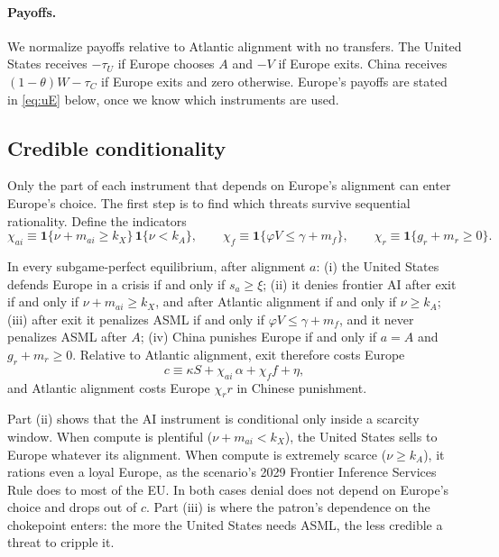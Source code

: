 

\paragraph{Payoffs.} We normalize payoffs relative to Atlantic alignment with no transfers. The United States receives $-\tau_U$ if Europe chooses $A$ and $-V$ if Europe exits. China receives $(1-\theta)W - \tau_C$ if Europe exits and zero otherwise. Europe's payoffs are stated in \cref{eq:uE} below, once we know which instruments are used.

\subsection{Credible conditionality}

Only the part of each instrument that depends on Europe's alignment can enter Europe's choice. The first step is to find which threats survive sequential rationality. Define the indicators
\begin{equation}\label{eq:chi}
\chi_{ai} \equiv \mathbf{1}\{\nu + m_{ai} \geq k_X\}\,\mathbf{1}\{\nu < k_A\},\qquad
\chi_f \equiv \mathbf{1}\{\varphi V \leq \gamma + m_f\},\qquad
\chi_r \equiv \mathbf{1}\{g_r + m_r \geq 0\}.
\end{equation}

\begin{lemma}\label{lem:credible}
In every subgame-perfect equilibrium, after alignment $a$: (i) the United States defends Europe in a crisis if and only if $s_a \geq \xi$; (ii) it denies frontier AI after exit if and only if $\nu + m_{ai} \geq k_X$, and after Atlantic alignment if and only if $\nu \geq k_A$; (iii) after exit it penalizes ASML if and only if $\varphi V \leq \gamma + m_f$, and it never penalizes ASML after $A$; (iv) China punishes Europe if and only if $a=A$ and $g_r + m_r \geq 0$. Relative to Atlantic alignment, exit therefore costs Europe
\begin{equation}\label{eq:c}
c \equiv \kappa S + \chi_{ai}\,\alpha + \chi_f f + \eta,
\end{equation}
and Atlantic alignment costs Europe $\chi_r r$ in Chinese punishment.
\end{lemma}

Part (ii) shows that the AI instrument is conditional only inside a scarcity window. When compute is plentiful ($\nu + m_{ai} < k_X$), the United States sells to Europe whatever its alignment. When compute is extremely scarce ($\nu \geq k_A$), it rations even a loyal Europe, as the scenario's 2029 Frontier Inference Services Rule does to most of the EU. In both cases denial does not depend on Europe's choice and drops out of $c$. Part (iii) is where the patron's dependence on the chokepoint enters: the more the United States needs ASML, the less credible a threat to cripple it.

